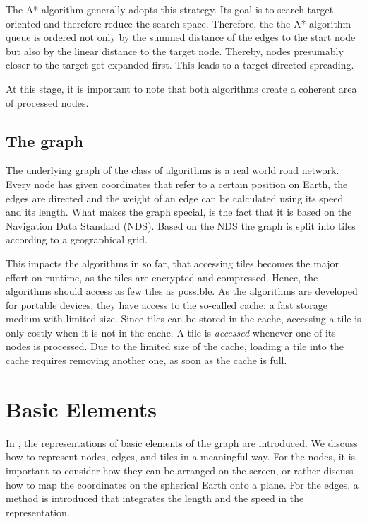 \documentclass
[
    paper = a4,
    pagesize,
    12 pt,
    oneside,                       %
    open = right,
    DIV = calc,
    BCOR = 0 mm,                   %
    bibtotoc
]
{scrbook}
\begin{document}
The A*-algorithm generally adopts this strategy.
Its goal is to search target oriented and therefore reduce the search space.
Therefore, the the A*-algorithm-queue is ordered not only by the summed distance of the edges to the start node but also by the linear distance to the target node.
Thereby, nodes presumably closer to the target get expanded first.
This leads to a target directed spreading.

At this stage, it is important to note that both algorithms create a coherent area of processed nodes.

\subsection{The graph} \label{spec_graph}

The underlying graph of the class of algorithms is a real world road network.
Every node has given coordinates that refer to a certain position on Earth, the edges are directed and the weight of an edge can be calculated using its speed and its length.
What makes the graph special, is the fact that it is based on the Navigation Data Standard (NDS).
Based on the NDS the graph is split into tiles according to a geographical grid.

This impacts the algorithms in so far, that accessing tiles becomes the major effort on runtime, as the tiles are encrypted and compressed.
Hence, the algorithms should access as few tiles as possible.
As the algorithms are developed for portable devices, they have access to the so-called cache: a fast storage medium with limited size.
Since tiles can be stored in the cache, accessing a tile is only costly when it is not in the cache.
A tile is \emph{accessed} whenever one of its nodes is processed.
Due to the limited size of the cache, loading a tile into the cache requires removing another one, as soon as the cache is full.


\section{Basic Elements}

In , the representations of basic elements of the graph are introduced.
We discuss how to represent nodes, edges, and tiles in a meaningful way.
For the nodes, it is important to consider how they can be arranged on the screen, or rather discuss how to map the coordinates on the spherical Earth onto a plane.
For the edges, a method is introduced that integrates the length and the speed in the representation.
\end{document}
